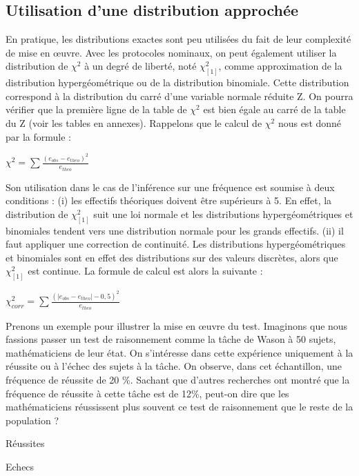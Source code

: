 \documentclass[]{book}
\theoremstyle{definition}
\theoremstyle{definition}
\theoremstyle{definition}
\theoremstyle{remark}
\begin{document}
\hypertarget{utilisation-dune-distribution-approchee}{%
\subsection{Utilisation d'une distribution
approchée}\label{utilisation-dune-distribution-approchee}}

En pratique, les distributions exactes sont peu utilisées du fait de
leur complexité de mise en œuvre. Avec les protocoles nominaux, on peut
également utiliser la distribution de \(\chi ^{2}\) à un degré de
liberté, noté \(\chi _{[1]}^{2}\), comme approximation de la
distribution hypergéométrique ou de la distribution binomiale. Cette
distribution correspond à la distribution du carré d'une variable
normale réduite Z. On pourra vérifier que la première ligne de la table
de \(\chi ^{2}\) est bien égale au carré de la table du Z (voir les
tables en annexes). Rappelons que le calcul de \(\chi ^{2}\) nous est
donné par la formule :

\(\chi^{2} = \sum \frac{(e_{obs}-e_{theo})^{2}}{e_{theo}}\)

Son utilisation dans le cas de l'inférence sur une fréquence est soumise
à deux conditions : (i) les effectifs théoriques doivent être supérieurs
à 5. En effet, la distribution de \(\chi _{[1]}^{2}\) suit une loi
normale et les distributions hypergéométriques et binomiales tendent
vers une distribution normale pour les grands effectifs. (ii) il faut
appliquer une correction de continuité. Les distributions
hypergéométriques et binomiales sont en effet des distributions sur des
valeurs discrètes, alors que \(\chi _{[1]}^{2}\) est continue. La
formule de calcul est alors la suivante :

\(\chi_{corr}^{2} = \sum \frac{(\left |e_{obs}-e_{theo} \right |-0,5)^{2}}{e_{theo}}\)

Prenons un exemple pour illustrer la mise en œuvre du test. Imaginons
que nous fassions passer un test de raisonnement comme la tâche de Wason
à 50 sujets, mathématiciens de leur état. On s'intéresse dans cette
expérience uniquement à la réussite ou à l'échec des sujets à la tâche.
On observe, dans cet échantillon, une fréquence de réussite de 20 \%.
Sachant que d'autres recherches ont montré que la fréquence de réussite
à cette tâche est de 12\%, peut-on dire que les mathématiciens
réussissent plus souvent ce test de raisonnement que le reste de la
population ?

Réussites

Echecs
\end{document}
